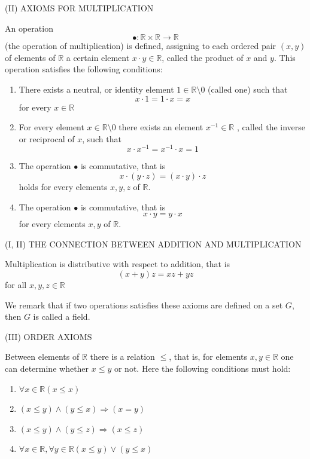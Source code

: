 \documentclass[a4paper,12pt]{article} %
\begin{document}
\begin{center}
    (II) AXIOMS FOR MULTIPLICATION
\end{center}
An operation \[\bullet:\mathbb{R}\times\mathbb{R}\to\mathbb{R}\]
(the operation of multiplication) is defined, assigning to 
each ordered pair $(x,y)$ of elements of $\mathbb{R}$ a certain
element $x\cdot y\in \mathbb{R}$, called the product of $x$ and 
$y$. This operation satisfies the following conditions:
\begin{enumerate}
    \item There exists a neutral, or identity element 
        $1\in \mathbb{R}\setminus 0$ (called one) such that 
        \[x\cdot 1 = 1\cdot x=x\] for every $x\in \mathbb{R}$
    \item For every element $x\in\mathbb{R}\setminus 0 $ 
        there exists an element $x^{-1}\in \mathbb{R}$ ,
        called the inverse or reciprocal of $x$, such that
        \[x\cdot x^{-1}=x^{-1}\cdot x=1\]
    \item The operation $\bullet$ is commutative, that is 
        \[x\cdot(y\cdot z) = (x\cdot y)\cdot z\] holds 
        for every elements $x,y,z$ of $\mathbb{R}$.
    \item The operation $\bullet$ is commutative, that is 
        \[ x\cdot y = y\cdot x\] for every elements $x,y$ of $\mathbb{R}$.
\end{enumerate}

\begin{center}
    (I, II) THE CONNECTION BETWEEN ADDITION AND MULTIPLICATION
\end{center}
Multiplication is distributive with respect to addition, that
is \[(x+y)z = xz+yz\] for all $x,y,z\in \mathbb{R}$

We remark that if two operations satisfies these axioms 
are defined on a set $G$, then $G$ is called a field.

\begin{center}
    (III) ORDER AXIOMS
\end{center}
Between elements of $\mathbb{R}$ there is a relation $\le$,
that is, for elements $x,y\in\mathbb{R}$ one can determine 
whether $x\le y$ or not. Here the following conditions must 
hold:
\begin{enumerate}
    \item $\forall x\in \mathbb{R}(x\le x)$
    \item $(x\le y)\wedge (y\le x) \Rightarrow (x=y)$
    \item $(x\le y) \wedge(y\le z) \Rightarrow (x\le z)$
    \item $\forall x\in \mathbb{R} ,\forall y\in \mathbb{R} (x\le y) \vee (y\le x)$
\end{enumerate}
\end{document}
